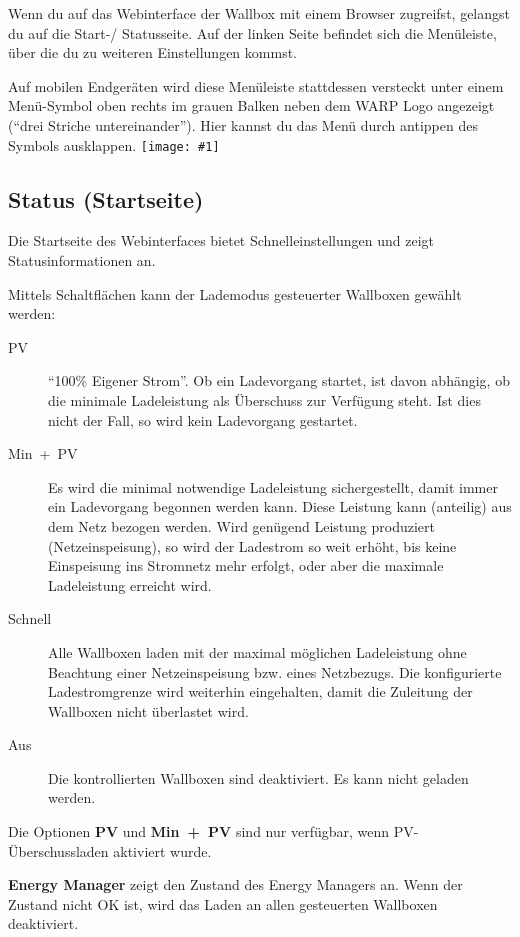 \documentclass[a4paper,10pt]{article}
\newcommand{\gfx}[1]{\texttt{[image: \#1]}}
\begin{document}
\begin{multicols*}{2}
	Wenn du auf das Webinterface der Wallbox mit einem Browser zugreifst,
	gelangst du auf die Start-/ Statusseite. Auf der linken Seite befindet sich
	die Menüleiste, über die du zu weiteren Einstellungen kommst.

	Auf mobilen Endgeräten wird
	diese Menüleiste stattdessen versteckt unter einem Menü-Symbol oben rechts
	im grauen Balken neben dem WARP Logo angezeigt (\enquote{drei Striche untereinander}).
	Hier kannst du das Menü durch antippen des Symbols ausklappen.
	\gfx{./img/resized/web_status}

	\vspace{-0.4cm}
	\subsection{Status (Startseite)}
	\label{status}
	Die Startseite des Webinterfaces bietet Schnelleinstellungen und zeigt Statusinformationen an.

	Mittels Schaltflächen kann der Lademodus gesteuerter
	Wallboxen gewählt werden:
	\begin{description}
	\item[PV] \enquote{100\% Eigener Strom}. Ob ein
	Ladevorgang startet, ist davon abhängig, ob die minimale Ladeleistung
	als Überschuss zur Verfügung steht. Ist dies nicht der Fall, so
	wird kein Ladevorgang gestartet.
	\item[Min~+~PV] Es wird die minimal notwendige Ladeleistung sichergestellt, damit immer ein Ladevorgang begonnen werden kann. Diese Leistung kann (anteilig) aus dem Netz bezogen werden. Wird genügend Leistung produziert (Netzeinspeisung), so wird
	der Ladestrom so weit erhöht, bis keine Einspeisung ins Stromnetz mehr
	erfolgt, oder aber die maximale Ladeleistung erreicht wird.
	\item[Schnell] Alle Wallboxen laden mit der maximal möglichen
	Ladeleistung ohne Beachtung einer Netzeinspeisung bzw. eines Netzbezugs. Die konfigurierte Ladestromgrenze wird weiterhin eingehalten, damit die Zuleitung der Wallboxen nicht überlastet wird.
	\item[Aus] Die kontrollierten Wallboxen sind deaktiviert. Es kann
	nicht geladen werden.
	\end{description}
	Die Optionen \textbf{PV} und \textbf{Min~+~PV} sind nur verfügbar, wenn PV-Überschussladen aktiviert wurde.

	\textbf{Energy Manager} zeigt den Zustand des Energy Managers an. Wenn der Zustand nicht OK ist, wird das Laden an allen gesteuerten Wallboxen deaktiviert.


\end{multicols*}
\end{document}
